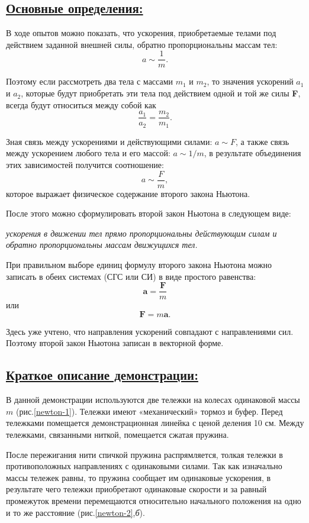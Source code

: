 \documentclass[14pt,a4paper,oneside]{extarticle}	%
\begin{document}
\newpage
\subsection*{\underline{Основные определения:}}

В ходе опытов можно показать, что ускорения, приобретаемые телами под действием заданной внешней силы, обратно пропорциональны массам тел: 
$$
a \sim \frac{1}{m}.
$$

Поэтому если рассмотреть два тела с массами $ m_1 $ и $ m_2 $, то значения ускорений $ a_1 $ и $ a_2 $, которые будут приобретать эти тела под действием одной и той же силы \textbf{F}, всегда будут относиться между собой как
$$
\frac{a_1}{a_2} = \frac{m_2}{m_1}.
$$

Зная связь между ускорениями и действующими силами: $ a \sim F $, а также связь между ускорением любого тела и его массой: $ a \sim 1/m$, в результате объединения этих зависимостей получится соотношение:
$$
a \sim \frac{F}{m},
$$
которое выражает физическое содержание второго закона Ньютона. 

После этого можно сформулировать второй закон Ньютона в 
следующем виде: 

\begin{flushleft}
	\textit{ускорения в движении тел прямо пропорциональны действующим 
силам и обратно пропорциональны массам движущихся тел. }
\end{flushleft}

При правильном выборе единиц формулу второго закона Ньютона 
можно записать в обеих системах (СГС или СИ) в виде простого равенства:
$$
 \textbf{a} = \frac{\textbf{F}}{m}
$$
 или
$$
\textbf{F} = m\textbf{a}.
$$
 
Здесь уже учтено, что направления ускорений совпадают с направлениями сил.
Поэтому второй закон Ньютона записан в векторной форме.

\newpage
\subsection*{\underline{Краткое описание демонстрации:}}

В данной демонстрации используются две тележки на колесах одинаковой массы $m$ (рис.\ref{newton-1}).
Тележки имеют «механический» тормоз и буфер.
Перед тележками помещается демонстрационная линейка с ценой деления 10 см.
Между тележками, связанными ниткой, помещается сжатая пружина.

После пережигания нити спичкой пружина распрямляется, толкая тележки в противоположных направлениях с одинаковыми силами.
Так как изначально массы тележек равны, то пружина сообщает им одинаковые ускорения, в результате чего тележки приобретают одинаковые скорости и за равный промежуток времени перемещаются относительно начального положения на одно и то же расстояние (рис.\ref{newton-2},\textit{б}).      
\end{document}
